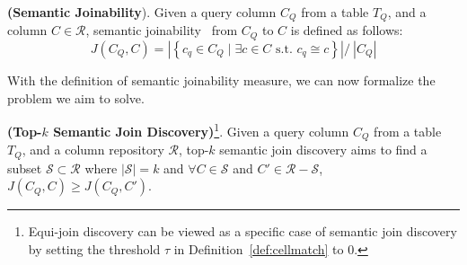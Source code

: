 
 

\begin{myDef}
\label{def:js}
\textnormal{\textbf{(Semantic Joinability}).} Given a query column $C_Q$ from a table $T_Q$, and a column $C \in \mathcal{R}$, semantic joinability~\cite{Pexeso,Deepjoin} from $C_Q$ to $C$ is defined as follows:
\begin{equation}
\label{eq:js}
    J(C_Q, C)= \left|\left\{c_q \in C_Q \mid  \exists c \in C \text { s.t. } c_q \cong c\right\}\right|/\ |C_Q|  
\end{equation}
\end{myDef}



 
With the definition of semantic joinability measure, we can now formalize the problem we aim to solve.

\begin{Prob}
\label{prob}
    \textnormal{\textbf{(Top-$k$ Semantic Join Discovery)}\footnote{Equi-join discovery can be viewed as a specific case of semantic join discovery by setting the threshold $\tau$ in Definition~\ref{def:cellmatch} to 0.}.}  Given a query column $C_Q$ from a table $T_Q$, and a column repository $\mathcal{R}$, top-$k$  semantic join discovery aims to find a subset $\mathcal{S} \subset \mathcal{R}$ where $|\mathcal{S}|=k$  and $ \forall C \in \mathcal{S}$ and $C' \in \mathcal{R} - \mathcal{S}$, $J(C_Q, C) \geq J(C_Q, C')$.
\end{Prob}

